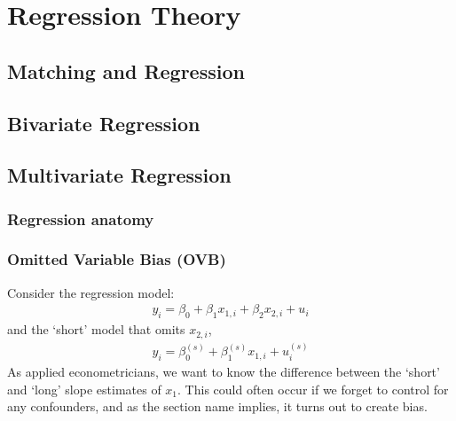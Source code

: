 \chapter{Regression Theory}
    \section{Matching and Regression}
    \section{Bivariate Regression}
    \section{Multivariate Regression}
        \subsection{Regression anatomy}

        \subsection{Omitted Variable Bias (OVB)}
            Consider the regression model:
            \begin{align}
                y_i = \beta_0 +\beta_1x_{1,i} +\beta_2 x_{2,i} + u_i 
            \end{align}
            and the `short' model that omits $x_{2,i}$,
            \begin{align}
                y_i = \beta_0^{(s)} +\beta_1^{(s)} x_{1,i} + u_i^{(s)}
            \end{align}
            As applied econometricians, we want to know the difference between the `short' and `long' slope estimates of $x_1$. This could often occur if we forget to control for any confounders, and as the section name implies, it turns out to create bias.
            
